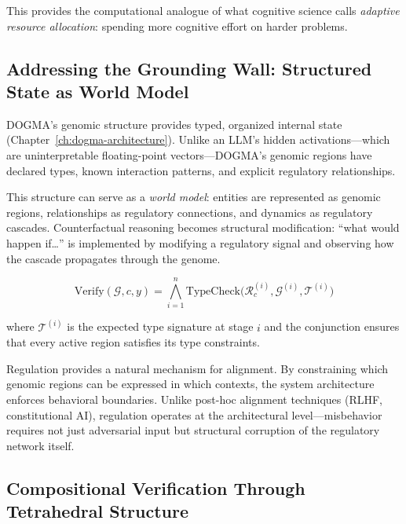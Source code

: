 This provides the computational analogue of what cognitive science calls \emph{adaptive resource allocation}: spending more cognitive effort on harder problems.

\subsection{Addressing the Grounding Wall: Structured State as World Model}

DOGMA's genomic structure provides typed, organized internal state (Chapter~\ref{ch:dogma-architecture}). Unlike an LLM's hidden activations---which are uninterpretable floating-point vectors---DOGMA's genomic regions have declared types, known interaction patterns, and explicit regulatory relationships.

This structure can serve as a \emph{world model}: entities are represented as genomic regions, relationships as regulatory connections, and dynamics as regulatory cascades. Counterfactual reasoning becomes structural modification: ``what would happen if\ldots'' is implemented by modifying a regulatory signal and observing how the cascade propagates through the genome.

\begin{equation}
\text{Verify}(\mathcal{G}, c, y) = \bigwedge_{i=1}^{n} \text{TypeCheck}\bigl(\mathcal{R}_c^{(i)}, \mathcal{G}^{(i)}, \mathcal{T}^{(i)}\bigr)
\label{eq:verify}
\end{equation}

where $\mathcal{T}^{(i)}$ is the expected type signature at stage $i$ and the conjunction ensures that every active region satisfies its type constraints.

\begin{implnote}
Regulation provides a natural mechanism for alignment. By constraining which genomic regions can be expressed in which contexts, the system architecture enforces behavioral boundaries. Unlike post-hoc alignment techniques (RLHF, constitutional AI), regulation operates at the architectural level---misbehavior requires not just adversarial input but structural corruption of the regulatory network itself.
\end{implnote}

\subsection{Compositional Verification Through Tetrahedral Structure}


